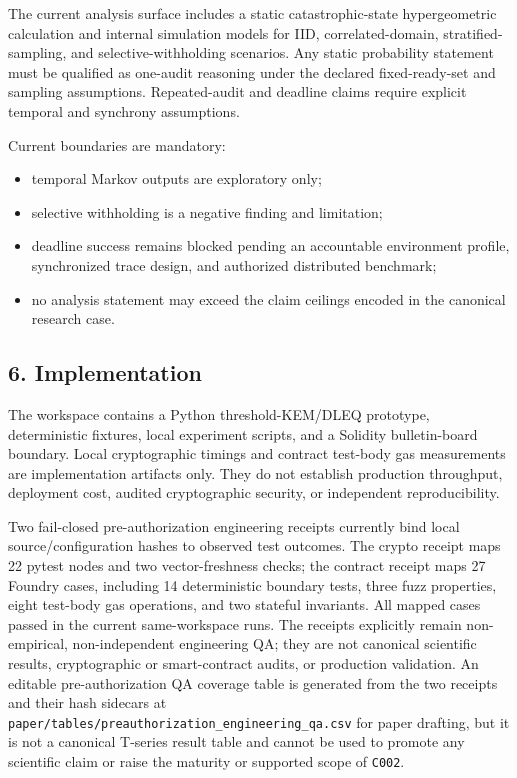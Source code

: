 \documentclass[
]{article}
\providecommand{\tightlist}{%
  \setlength{\itemsep}{0pt}\setlength{\parskip}{0pt}}
\begin{document}
The current analysis surface includes a static catastrophic-state
hypergeometric calculation and internal simulation models for IID,
correlated-domain, stratified-sampling, and selective-withholding
scenarios. Any static probability statement must be qualified as
one-audit reasoning under the declared fixed-ready-set and sampling
assumptions. Repeated-audit and deadline claims require explicit
temporal and synchrony assumptions.

Current boundaries are mandatory:

\begin{itemize}
\tightlist
\item
  temporal Markov outputs are exploratory only;
\item
  selective withholding is a negative finding and limitation;
\item
  deadline success remains blocked pending an accountable environment
  profile, synchronized trace design, and authorized distributed
  benchmark;
\item
  no analysis statement may exceed the claim ceilings encoded in the
  canonical research case.
\end{itemize}

\subsection{6. Implementation}\label{implementation}

The workspace contains a Python threshold-KEM/DLEQ prototype,
deterministic fixtures, local experiment scripts, and a Solidity
bulletin-board boundary. Local cryptographic timings and contract
test-body gas measurements are implementation artifacts only. They do
not establish production throughput, deployment cost, audited
cryptographic security, or independent reproducibility.

Two fail-closed pre-authorization engineering receipts currently bind
local source/configuration hashes to observed test outcomes. The crypto
receipt maps 22 pytest nodes and two vector-freshness checks; the
contract receipt maps 27 Foundry cases, including 14 deterministic
boundary tests, three fuzz properties, eight test-body gas operations,
and two stateful invariants. All mapped cases passed in the current
same-workspace runs. The receipts explicitly remain non-empirical,
non-independent engineering QA; they are not canonical scientific
results, cryptographic or smart-contract audits, or production
validation. An editable pre-authorization QA coverage table is generated
from the two receipts and their hash sidecars at
\texttt{paper/tables/preauthorization\_engineering\_qa.csv} for paper
drafting, but it is not a canonical T-series result table and cannot be
used to promote any scientific claim or raise the maturity or supported
scope of \texttt{C002}.
\end{document}
